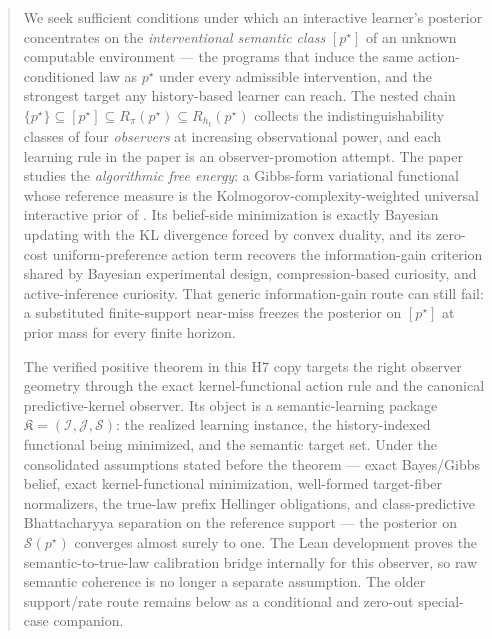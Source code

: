 \documentclass[11pt]{article}
\theoremstyle{definition}
\theoremstyle{remark}
\newcommand{\Scal}{\mathcal{S}}
\begin{document}
\begin{abstract}
We seek sufficient conditions under which an interactive learner's posterior concentrates on the \emph{interventional semantic class} $[p^\star]$ of an unknown computable environment --- the programs that induce the same action-conditioned law as $p^\star$ under every admissible intervention, and the strongest target any history-based learner can reach. The nested chain $\{p^\star\}\subseteq[p^\star]\subseteq R_\pi(p^\star)\subseteq R_{h_t}(p^\star)$ collects the indistinguishability classes of four \emph{observers} at increasing observational power, and each learning rule in the paper is an observer-promotion attempt. The paper studies the \emph{algorithmic free energy}: a Gibbs-form variational functional whose reference measure is the Kolmogorov-complexity-weighted universal interactive prior of \citet{Solomonoff1964a,Solomonoff1964b,Kolmogorov1965,Hutter2005}. Its belief-side minimization is exactly Bayesian updating with the KL divergence forced by convex duality, and its zero-cost uniform-preference action term recovers the information-gain criterion shared by Bayesian experimental design, compression-based curiosity, and active-inference curiosity. That generic information-gain route can still fail: a substituted finite-support near-miss freezes the posterior on $[p^\star]$ at prior mass for every finite horizon.

The verified positive theorem in this H7 copy targets the right observer geometry through the exact kernel-functional action rule and the canonical predictive-kernel observer. Its object is a semantic-learning package $\mathfrak K=(\mathcal I,\mathcal J,\Scal)$: the realized learning instance, the history-indexed functional being minimized, and the semantic target set. Under the consolidated assumptions stated before the theorem --- exact Bayes/Gibbs belief, exact kernel-functional minimization, well-formed target-fiber normalizers, the true-law prefix Hellinger obligations, and class-predictive Bhattacharyya separation on the reference support --- the posterior on $\Scal(p^\star)$ converges almost surely to one. The Lean development proves the semantic-to-true-law calibration bridge internally for this observer, so raw semantic coherence is no longer a separate assumption. The older support/rate route remains below as a conditional and zero-out special-case companion.


\end{abstract}
\end{document}
